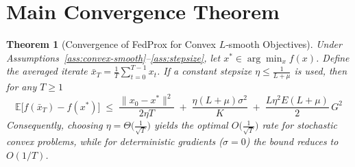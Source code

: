\documentclass[11pt]{article}
\newtheorem{theorem}{Theorem}
\newcommand{\E}{\mathbb{E}}
\begin{document}
\section*{Main Convergence Theorem}
\begin{theorem}[Convergence of FedProx for Convex $L$‑smooth Objectives]
\label{thm:convex}
Under Assumptions~\ref{ass:convex-smooth}–\ref{ass:stepsize},
let $x^{\ast}\in\arg\min_{x}f(x)$.
Define the averaged iterate $\bar{x}_T=\frac1T\sum_{t=0}^{T-1}x_t$.
If a constant stepsize $\eta\le\frac{1}{L+\mu}$ is used, then for any $T\ge1$
\[
\boxed{
\E\!\bigl[f(\bar{x}_T)-f(x^{\ast})\bigr]
\;\le\;
\frac{\|x_0-x^{\ast}\|^{2}}{2\eta T}
\;+\;
\frac{\eta(L+\mu)\sigma^{2}}{K}
\;+\;
\frac{L\eta^{2}E(L+\mu)}{2}\,G^{2}
}
\tag{1}
\]
Consequently, choosing $\eta=\Theta\!\bigl(\tfrac{1}{\sqrt{T}}\bigr)$ yields the
optimal $O\!\bigl(\tfrac{1}{\sqrt{T}}\bigr)$ rate for stochastic convex problems,
while for deterministic gradients ($\sigma=0$) the bound reduces to $O(1/T)$.
\end{theorem}
\end{document}
